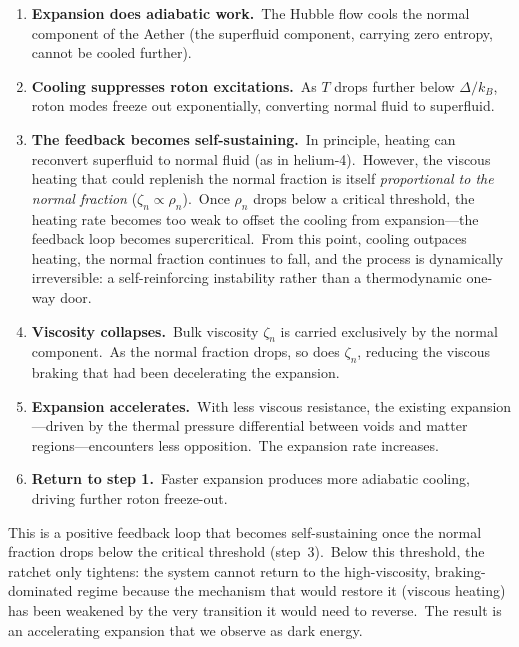 \documentclass[12pt,letterpaper]{article}
\begin{document}
\begin{enumerate}[leftmargin=2em]
  \item \textbf{Expansion does adiabatic work.}\ The Hubble flow cools the
    normal component of the Aether (the superfluid component, carrying zero
    entropy, cannot be cooled further).

  \item \textbf{Cooling suppresses roton excitations.}\ As $T$ drops further
    below $\Delta/k_B$, roton modes freeze out exponentially, converting normal
    fluid to superfluid.

  \item \textbf{The feedback becomes self-sustaining.}\ In principle, heating
    can reconvert superfluid to normal fluid (as in helium-4).\ However, the
    viscous heating that could replenish the normal fraction is itself
    \emph{proportional to the normal fraction} ($\zeta_n \propto \rho_n$).\
    Once $\rho_n$ drops below a critical threshold, the heating rate becomes
    too weak to offset the cooling from expansion---the feedback loop becomes
    supercritical.\ From this point, cooling outpaces heating, the normal
    fraction continues to fall, and the process is dynamically irreversible:
    a self-reinforcing instability rather than a thermodynamic one-way door.

  \item \textbf{Viscosity collapses.}\ Bulk viscosity $\zeta_n$ is carried
    exclusively by the normal component.\ As the normal fraction drops, so does
    $\zeta_n$, reducing the viscous braking that had been decelerating the
    expansion.

  \item \textbf{Expansion accelerates.}\ With less viscous resistance, the
    existing expansion---driven by the thermal pressure differential between
    voids and matter regions---encounters less opposition.\ The expansion rate
    increases.

  \item \textbf{Return to step 1.}\ Faster expansion produces more adiabatic
    cooling, driving further roton freeze-out.
\end{enumerate}

This is a positive feedback loop that becomes self-sustaining once the normal
fraction drops below the critical threshold (step~3).\ Below this threshold,
the ratchet only tightens: the system cannot return to the high-viscosity,
braking-dominated regime because the mechanism that would restore it (viscous
heating) has been weakened by the very transition it would need to reverse.\
The result is an accelerating expansion that we observe as dark energy.
\end{document}
